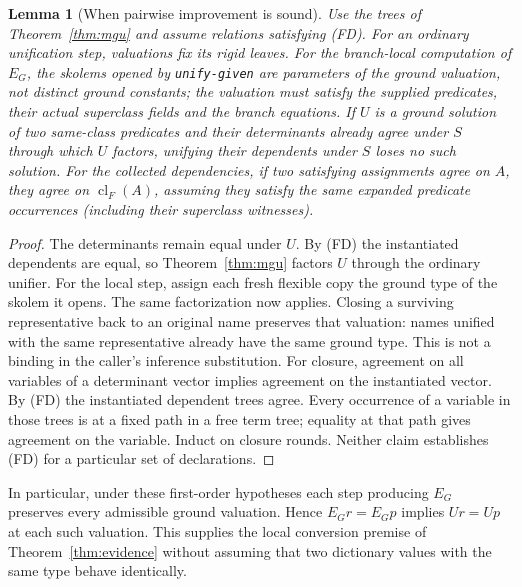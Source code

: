 \documentclass[11pt]{article}
\newtheorem{lemma}[theorem]{Lemma}
\theoremstyle{definition}
\newcommand{\src}[1]{\nolinkurl{#1}}
\newcommand{\clo}{\operatorname{cl}}
\begin{document}
\begin{lemma}[When pairwise improvement is sound]\label{lem:fd}
Use the trees of Theorem~\ref{thm:mgu} and assume relations satisfying
(FD). For an ordinary unification step, valuations fix its rigid leaves.
For the branch-local computation of $E_G$, the skolems opened by
\src{unify-given} are parameters of the ground valuation, not distinct
ground constants; the valuation must satisfy the supplied predicates,
their actual superclass fields and the branch equations. If $U$
is a ground solution of two same-class predicates and their determinants
already agree under $S$ through which $U$ factors, unifying their dependents
under $S$ loses no such solution. For the collected dependencies, if two
satisfying assignments agree on $A$, they agree on $\clo_F(A)$, assuming
they satisfy the same expanded predicate occurrences (including their
superclass witnesses).
\end{lemma}
\begin{proof}
The determinants remain equal under $U$. By (FD) the instantiated
dependents are equal, so Theorem~\ref{thm:mgu} factors $U$ through the
ordinary unifier. For the local step, assign each fresh flexible copy
the ground type of the skolem it opens. The same factorization now
applies. Closing a surviving representative back to an original name
preserves that valuation: names unified with the same representative
already have the same ground type. This is not a binding in the caller's
inference substitution. For closure, agreement on all variables of a
determinant vector implies agreement on the instantiated vector. By (FD)
the instantiated dependent trees agree. Every occurrence of a variable
in those trees is at a fixed path in a free term tree; equality at that
path gives agreement on the variable. Induct on closure rounds. Neither
claim establishes (FD) for a particular set of declarations.
\end{proof}
In particular, under these first-order hypotheses each step producing
$E_G$ preserves every admissible ground valuation. Hence $E_G r=E_G p$
implies $Ur=Up$ at each such valuation. This supplies the local conversion
premise of Theorem~\ref{thm:evidence} without assuming that two dictionary
values with the same type behave identically.
\end{document}
